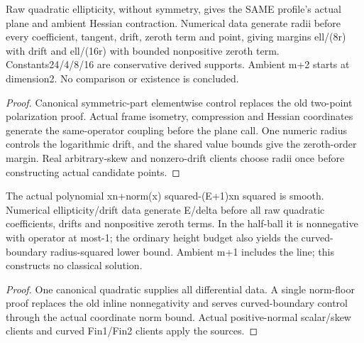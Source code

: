 \begin{lemma}
  \label{lem:log-radial-operator}
  \leanok
  Raw quadratic ellipticity, without symmetry, gives the SAME profile's
  actual plane and ambient Hessian contraction. Numerical data generate
  radii before every coefficient, tangent, drift, zeroth term and point,
  giving margins ell/(8r) with drift and ell/(16r) with bounded nonpositive
  zeroth term. Constants24/4/8/16 are conservative derived supports.
  Ambient m+2 starts at dimension2. No comparison or existence is concluded.
\end{lemma}
\begin{proof}
  \leanok
  Canonical symmetric-part elementwise control replaces the old two-point
  polarization proof. Actual frame isometry, compression and Hessian
  coordinates generate the same-operator coupling before the plane call.
  One numeric radius controls the logarithmic drift, and the shared value
  bounds give the zeroth-order margin. Real arbitrary-skew and nonzero-drift
  clients choose radii once before constructing actual candidate points.
\end{proof}

\begin{lemma}
  \label{lem:halfball-polynomial}
  \leanok
  The actual polynomial xn+norm(x) squared-(E+1)xn squared is smooth.
  Numerical ellipticity/drift data generate E/delta before all raw
  quadratic coefficients, drifts and nonpositive zeroth terms. In the
  half-ball it is nonnegative with operator at most-1; the ordinary height
  budget also yields the curved-boundary radius-squared lower bound.
  Ambient m+1 includes the line; this constructs no classical solution.
\end{lemma}
\begin{proof}
  \leanok
  One canonical quadratic supplies all differential data. A single norm-floor
  proof replaces the old inline nonnegativity and serves curved-boundary
  control through the actual coordinate norm bound. Actual positive-normal
  scalar/skew clients and curved Fin1/Fin2 clients apply the sources.
\end{proof}



